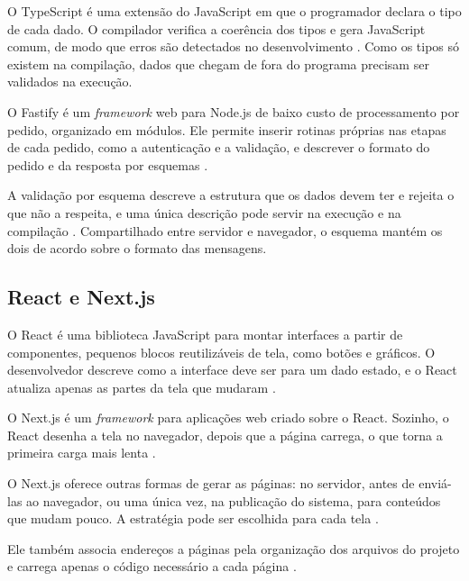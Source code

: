 \par O TypeScript é uma extensão do JavaScript em que o programador declara o tipo de cada dado. O compilador verifica a coerência dos tipos e gera JavaScript comum, de modo que erros são detectados no desenvolvimento \cite{TYPESCRIPT_DOCS}. Como os tipos só existem na compilação, dados que chegam de fora do programa precisam ser validados na execução.

\par O Fastify é um \emph{framework} web para Node.js de baixo custo de processamento por pedido, organizado em módulos. Ele permite inserir rotinas próprias nas etapas de cada pedido, como a autenticação e a validação, e descrever o formato do pedido e da resposta por esquemas \cite{FASTIFY_DOCS}.

\par A validação por esquema descreve a estrutura que os dados devem ter e rejeita o que não a respeita, e uma única descrição pode servir na execução e na compilação \cite{FASTIFY_DOCS}. Compartilhado entre servidor e navegador, o esquema mantém os dois de acordo sobre o formato das mensagens.

\subsection{React e Next.js}

\par O React é uma biblioteca JavaScript para montar interfaces a partir de componentes, pequenos blocos reutilizáveis de tela, como botões e gráficos. O desenvolvedor descreve como a interface deve ser para um dado estado, e o React atualiza apenas as partes da tela que mudaram \cite{REACT_DOCS}.

\par O Next.js é um \emph{framework} para aplicações web criado sobre o React. Sozinho, o React desenha a tela no navegador, depois que a página carrega, o que torna a primeira carga mais lenta \cite{NEXTJS_DOCS}.

\par O Next.js oferece outras formas de gerar as páginas: no servidor, antes de enviá-las ao navegador, ou uma única vez, na publicação do sistema, para conteúdos que mudam pouco. A estratégia pode ser escolhida para cada tela \cite{NEXTJS_DOCS}.

\par Ele também associa endereços a páginas pela organização dos arquivos do projeto e carrega apenas o código necessário a cada página \cite{NEXTJS_DOCS}.


